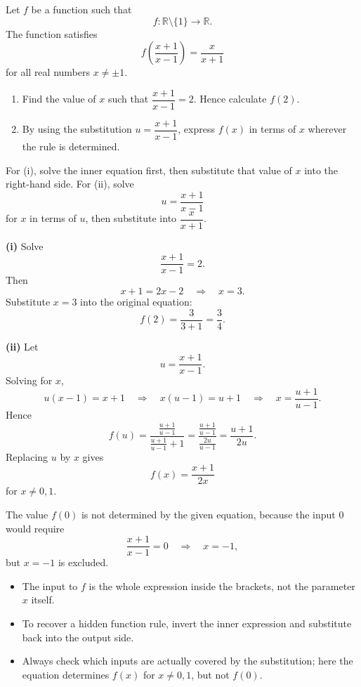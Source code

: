 \begin{problem}
Let $f$ be a function such that
\[
f:\mathbb{R}\setminus\{1\}\to\mathbb{R}.
\]
The function satisfies
\[
f\!\left(\frac{x+1}{x-1}\right)=\frac{x}{x+1}
\]
for all real numbers $x\ne \pm 1$.
\begin{enumerate}[label=(\roman*)]
\item Find the value of $x$ such that $\dfrac{x+1}{x-1}=2$. Hence calculate $f(2)$.
\item By using the substitution $u=\dfrac{x+1}{x-1}$, express $f(x)$ in terms of $x$ wherever the rule is determined.
\end{enumerate}
\end{problem}

\begin{hint}
For (i), solve the inner equation first, then substitute that value of $x$ into the right-hand side. For (ii), solve
\[
u=\frac{x+1}{x-1}
\]
for $x$ in terms of $u$, then substitute into $\dfrac{x}{x+1}$.
\end{hint}

\begin{solution}
\textbf{(i)} Solve
\[
\frac{x+1}{x-1}=2.
\]
Then
\[
x+1=2x-2
\quad\Longrightarrow\quad
x=3.
\]
Substitute $x=3$ into the original equation:
\[
f(2)=\frac{3}{3+1}=\boxed{\frac34}.
\]

\textbf{(ii)} Let
\[
u=\frac{x+1}{x-1}.
\]
Solving for $x$,
\[
u(x-1)=x+1
\quad\Longrightarrow\quad
x(u-1)=u+1
\quad\Longrightarrow\quad
x=\frac{u+1}{u-1}.
\]
Hence
\[
f(u)=\frac{\frac{u+1}{u-1}}{\frac{u+1}{u-1}+1}
=\frac{\frac{u+1}{u-1}}{\frac{2u}{u-1}}
=\frac{u+1}{2u}.
\]
Replacing $u$ by $x$ gives
\[
\boxed{f(x)=\frac{x+1}{2x}}
\]
for $x\ne 0,1$.

The value $f(0)$ is not determined by the given equation, because the input $0$ would require
\[
\frac{x+1}{x-1}=0
\quad\Longrightarrow\quad
x=-1,
\]
but $x=-1$ is excluded.
\end{solution}

\begin{takeaways}
\begin{itemize}[leftmargin=*]
\item The input to $f$ is the whole expression inside the brackets, not the parameter $x$ itself.
\item To recover a hidden function rule, invert the inner expression and substitute back into the output side.
\item Always check which inputs are actually covered by the substitution; here the equation determines $f(x)$ for $x\ne 0,1$, but not $f(0)$.
\end{itemize}
\end{takeaways}

